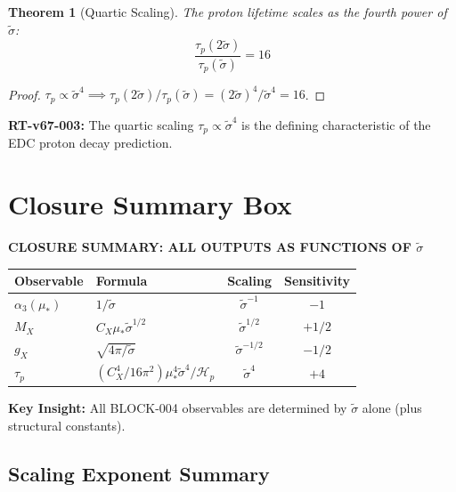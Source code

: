 \documentclass[11pt,letterpaper]{article}
\newtheorem{theorem}{Theorem}[section]
\newcommand{\st}{\tilde{\sigma}}
\newcommand{\Hp}{\mathcal{H}_p}
\begin{document}
\begin{theorem}[Quartic Scaling]
\label{thm:quartic-scaling}
The proton lifetime scales as the fourth power of $\st$:
\begin{equation}
\frac{\tau_p(2\st)}{\tau_p(\st)} = 16
\label{eq:quartic-demo}
\end{equation}
\end{theorem}

\begin{proof}
$\tau_p \propto \st^4 \implies \tau_p(2\st)/\tau_p(\st) = (2\st)^4/\st^4 = 16$.
\end{proof}

\begin{reviewertrap}
\textbf{RT-v67-003:} The quartic scaling $\tau_p \propto \st^4$ is the defining characteristic of the EDC proton decay prediction.
\end{reviewertrap}

\section{Closure Summary Box}
\label{sec:closure-summary}

\begin{mapbox}
\textbf{CLOSURE SUMMARY: ALL OUTPUTS AS FUNCTIONS OF $\st$}

\begin{center}
\begin{tabular}{llcc}
\toprule
Observable & Formula & Scaling & Sensitivity \\
\midrule
$\alpha_3(\mu_*)$ & $1/\st$ & $\st^{-1}$ & $-1$ \\
$M_X$ & $C_X \mu_* \st^{1/2}$ & $\st^{1/2}$ & $+1/2$ \\
$g_X$ & $\sqrt{4\pi/\st}$ & $\st^{-1/2}$ & $-1/2$ \\
$\tau_p$ & $(C_X^4/16\pi^2) \mu_*^4 \st^4 / \Hp$ & $\st^{4}$ & $+4$ \\
\bottomrule
\end{tabular}
\end{center}

\textbf{Key Insight:} All BLOCK-004 observables are determined by $\st$ alone (plus structural constants).
\end{mapbox}

\subsection{Scaling Exponent Summary}
\label{subsec:scaling-summary}
\end{document}
